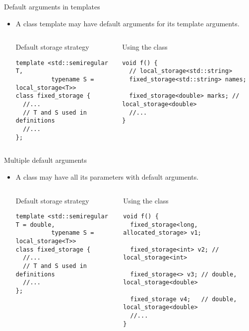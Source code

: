 \begin{frame}[t,fragile]{Default arguments in templates}
\begin{itemize}
  \item A class template may have default arguments for its template arguments.

\begin{columns}[T]

\begin{block}{Default storage strategy}
\begin{lstlisting}
template <std::semiregular T, 
          typename S = local_storage<T>>
class fixed_storage {
  //...
  // T and S used in definitions
  //...
};
\end{lstlisting}
\end{block}

\pause
{}
\begin{block}{Using the class}
\begin{lstlisting}
void f() {
  // local_storage<std::string>
  fixed_storage<std::string> names;

  fixed_storage<double> marks; // local_storage<double>
  //...
}
\end{lstlisting}
\end{block}

\end{columns}

\end{itemize}
\end{frame}

\begin{frame}[t,fragile]{Multiple default arguments}
\begin{itemize}
  \item A class may have all its parameters with default arguments.

\begin{columns}[T]

\begin{block}{Default storage strategy}
\begin{lstlisting}
template <std::semiregular T = double, 
          typename S = local_storage<T>>
class fixed_storage {
  //...
  // T and S used in definitions
  //...
};
\end{lstlisting}
\end{block}

\pause
{}
\begin{block}{Using the class}
\begin{lstlisting}
void f() {
  fixed_storage<long, allocated_storage> v1;

  fixed_storage<int> v2; // local_storage<int>

  fixed_storage<> v3; // double, local_storage<double>

  fixed_storage v4;   // double, local_storage<double>
  //...
}
\end{lstlisting}
\end{block}

\end{columns}

\end{itemize}
\end{frame}

